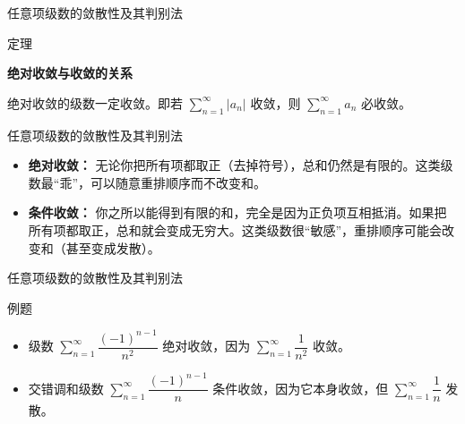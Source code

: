 \documentclass[aspectratio=169,10pt,fontset=fandol]{ctexbeamer}
\newenvironment{custom}[1]{\par\noindent\textbf{#1}\quad}{\par\vspace{0.8em}}
\begin{document}
\begin{frame}[t,fragile]{任意项级数的敛散性及其判别法}
\normalsize
\begin{block}{定理}
{\normalsize
\textbf{绝对收敛与收敛的关系}\par

	绝对收敛的级数一定收敛。即若 \(\sum\limits_{n = 1}^{  \infty } |a_n|\) 收敛，则 \(\sum\limits_{n = 1}^{  \infty } a_n\) 必收敛。

}
\end{block}
\end{frame}
\begin{frame}[t,fragile]{任意项级数的敛散性及其判别法}
\normalsize
{\normalsize
\begin{itemize}
		\item \textbf{绝对收敛：} 无论你把所有项都取正（去掉符号），总和仍然是有限的。这类级数最“乖”，可以随意重排顺序而不改变和。
		\item \textbf{条件收敛：} 你之所以能得到有限的和，完全是因为正负项互相抵消。如果把所有项都取正，总和就会变成无穷大。这类级数很“敏感”，重排顺序可能会改变和（甚至变成发散）。
	\end{itemize}

}
\end{frame}
\begin{frame}[t,fragile]{任意项级数的敛散性及其判别法}
\normalsize
\begin{block}{例题}
{\normalsize
\begin{itemize}
		\item 级数 \(\sum\limits_{n = 1}^{  \infty } \dfrac{(-1)^{n-1}}{n^2}\) 绝对收敛，因为 \(\sum\limits_{n = 1}^{  \infty } \dfrac{1}{n^2}\) 收敛。
		\item 交错调和级数 \(\sum\limits_{n = 1}^{  \infty } \dfrac{(-1)^{n-1}}{n}\) 条件收敛，因为它本身收敛，但 \(\sum\limits_{n = 1}^{  \infty } \dfrac{1}{n}\) 发散。
	\end{itemize}

}
\end{block}
\end{frame}
\end{document}
